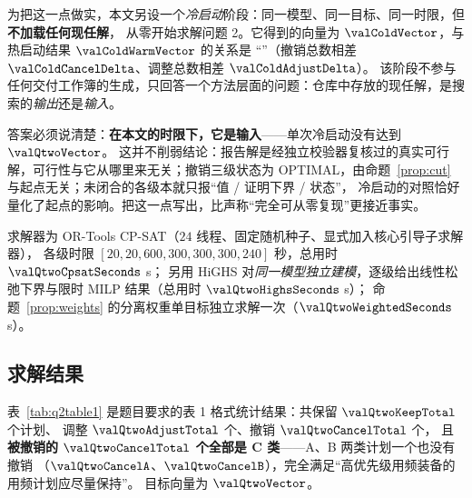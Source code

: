 为把这一点做实，本文另设一个\emph{冷启动}阶段：同一模型、同一目标、同一时限，但\textbf{不加载任何现任解}，
从零开始求解问题 2。它得到的向量为 $\valColdVector$，与热启动结果 $\valColdWarmVector$ 的关系是
“\valColdRelation{}”（撤销总数相差 $\valColdCancelDelta$、调整总数相差 $\valColdAdjustDelta$）。
该阶段不参与任何交付工作簿的生成，只回答一个方法层面的问题：仓库中存放的现任解，是搜索的\emph{输出}还是\emph{输入}。

答案必须说清楚：\textbf{在本文的时限下，它是输入}——单次冷启动没有达到 $\valQtwoVector$。
这并不削弱结论：报告解是经独立校验器复核过的真实可行解，可行性与它从哪里来无关；撤销三级状态为
\textsf{OPTIMAL}，由命题~\ref{prop:cut} 与起点无关；未闭合的各级本就只报“值 / 证明下界 / 状态”，
冷启动的对照恰好量化了起点的影响。把这一点写出，比声称“完全可从零复现”更接近事实。

求解器为 OR-Tools CP-SAT\cite{ortools2025}（$24$ 线程、固定随机种子、显式加入核心引导子求解器），
各级时限 $[20,20,600,300,300,300,240]$ 秒，总用时 $\valQtwoCpsatSeconds$ s；
另用 HiGHS\cite{huangfu2018} 对\emph{同一模型独立建模}，逐级给出线性松弛下界与限时 MILP 结果（总用时 $\valQtwoHighsSeconds$ s）；
命题~\ref{prop:weights} 的分离权重单目标独立求解一次（$\valQtwoWeightedSeconds$ s）。

\subsection{求解结果}

\begin{table}[htbp]
\centering\small
\begin{minipage}[t]{0.38\linewidth}
\centering
\caption{\textbf{问题 2：时频冲突消解的统计结果}（题目表 1 格式）。}\label{tab:q2table1}

\end{minipage}\hfill
\begin{minipage}[t]{0.58\linewidth}
\centering
\caption{问题 2 模型规模与求解设置。}\label{tab:q2model}
\resizebox{\linewidth}{!}{}
\end{minipage}
\end{table}

表~\ref{tab:q2table1} 是题目要求的表 1 格式统计结果：共保留 $\valQtwoKeepTotal$ 个计划、
调整 $\valQtwoAdjustTotal$ 个、撤销 $\valQtwoCancelTotal$ 个，
且\textbf{被撤销的 $\valQtwoCancelTotal$ 个全部是 C 类}——A、B 两类计划一个也没有撤销
（$\valQtwoCancelA$、$\valQtwoCancelB$），完全满足“高优先级用频装备的用频计划应尽量保持”。
目标向量为 $\valQtwoVector$。


